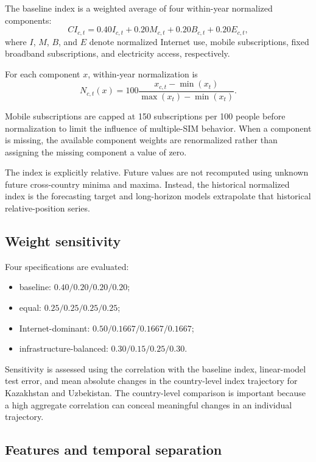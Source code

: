 \documentclass[conference]{IEEEtran}
\begin{document}
The baseline index is a weighted average of four within-year normalized components:
\begin{equation}
CI_{c,t} =
0.40 I_{c,t}+
0.20 M_{c,t}+
0.20 B_{c,t}+
0.20 E_{c,t},
\end{equation}
where $I$, $M$, $B$, and $E$ denote normalized Internet use, mobile subscriptions, fixed broadband subscriptions, and electricity access, respectively.

For each component $x$, within-year normalization is
\begin{equation}
N_{c,t}(x)=100
\frac{x_{c,t}-\min(x_t)}
{\max(x_t)-\min(x_t)}.
\end{equation}

Mobile subscriptions are capped at 150 subscriptions per 100 people before normalization to limit the influence of multiple-SIM behavior. When a component is missing, the available component weights are renormalized rather than assigning the missing component a value of zero.

The index is explicitly relative. Future values are not recomputed using unknown future cross-country minima and maxima. Instead, the historical normalized index is the forecasting target and long-horizon models extrapolate that historical relative-position series.

\subsection{Weight sensitivity}

Four specifications are evaluated:
\begin{itemize}
\item baseline: $0.40/0.20/0.20/0.20$;
\item equal: $0.25/0.25/0.25/0.25$;
\item Internet-dominant: $0.50/0.1667/0.1667/0.1667$;
\item infrastructure-balanced: $0.30/0.15/0.25/0.30$.
\end{itemize}

Sensitivity is assessed using the correlation with the baseline index, linear-model test error, and mean absolute changes in the country-level index trajectory for Kazakhstan and Uzbekistan. The country-level comparison is important because a high aggregate correlation can conceal meaningful changes in an individual trajectory.

\subsection{Features and temporal separation}
\end{document}
